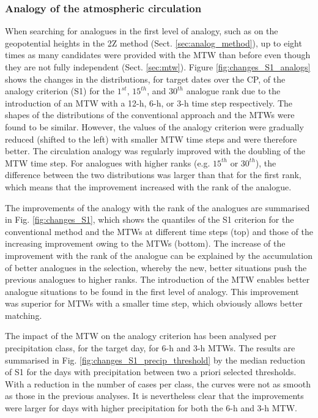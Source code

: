 \documentclass[hess, manuscript]{copernicus}
\begin{document}
	\subsubsection{Analogy of the atmospheric circulation}
	\label{sec:changes_analogy_circul}
	
	When searching for analogues in the first level of analogy, such as on the geopotential heights in the 2Z method (Sect. \ref{sec:analog_method}), up to eight times as many candidates were provided with the MTW than before even though they are not fully independent (Sect. \ref{sec:mtw}). Figure \ref{fig:changes_S1_analogs} shows the changes in the distributions, for target dates over the CP, of the analogy criterion (S1) for the $1^{st}$, $15^{th}$, and $30^{th}$ analogue rank due to the introduction of an MTW with a 12-h, 6-h, or 3-h time step respectively. The shapes of the distributions of the conventional approach and the MTWs were found to be similar. However, the values of the analogy criterion were gradually reduced (shifted to the left) with smaller MTW time steps and were therefore better. The circulation analogy was regularly improved with the doubling of the MTW time step. For analogues with higher ranks (e.g. $15^{th}$ or $30^{th}$), the difference between the two distributions was larger than that for the first rank, which means that the improvement increased with the rank of the analogue. 
	
	The improvements of the analogy with the rank of the analogues are summarised in Fig. \ref{fig:changes_S1}, which shows the quantiles of the S1 criterion for the conventional method and the MTWs at different time steps (top) and those of the increasing improvement owing to the MTWs (bottom). The increase of the improvement with the rank of the analogue can be explained by the accumulation of better analogues in the selection, whereby the new, better situations push the previous analogues to higher ranks. The introduction of the MTW enables better analogue situations to be found in the first level of analogy. This improvement was superior for MTWs with a smaller time step, which obviously allows better matching.
	
	The impact of the MTW on the analogy criterion has been analysed per precipitation class, for the target day, for 6-h and 3-h MTWs. The results are summarised in Fig. \ref{fig:changes_S1_precip_threshold} by the median reduction of S1 for the days with precipitation between two a priori selected thresholds. With a reduction in the number of cases per class, the curves were not as smooth as those in the previous analyses. It is nevertheless clear that the improvements were larger for days with higher precipitation for both the 6-h and 3-h MTW.
	
\end{document}

